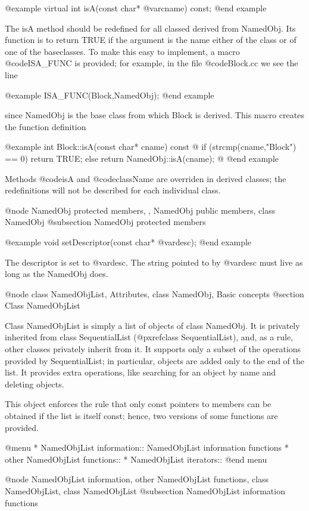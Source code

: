 @example
virtual int isA(const char* @var{cname}) const;
@end example

The isA method should be redefined for all classed derived from
NamedObj.  Its function is to return TRUE if the argument is the name
either of the class or of one of the baseclasses.  To make this easy to
implement, a macro @code{ISA_FUNC} is provided; for example, in the
file @code{Block.cc} we see the line

@example
ISA_FUNC(Block,NamedObj);
@end example

since NamedObj is the base class from which Block is derived.  This
macro creates the function definition

@example
int Block::isA(const char* cname) const @{
        if (strcmp(cname,"Block") == 0) return TRUE;
        else return NamedObj::isA(cname);
@}
@end example

Methods @code{isA} and @code{className} are overriden in derived
classes; the redefinitions will not be described for each individual
class.

@node NamedObj protected members,  , NamedObj public members, class NamedObj
@subsection NamedObj protected members

@example
void setDescriptor(const char* @var{desc});
@end example

The descriptor is set to @var{desc}.  The string pointed to by
@var{desc} must live as long as the NamedObj does.

@node class NamedObjList, Attributes, class NamedObj, Basic concepts
@section Class NamedObjList

Class NamedObjList is simply a list of objects of class NamedObj.
It is privately inherited from class SequentialList
(@pxref{class SequentialList}), and, as a rule,
other classes privately inherit from it.  It supports only a subset
of the operations provided by SequentialList; in particular, objects
are added only to the end of the list.  It provides extra operations,
like searching for an object by name and deleting objects.

This object enforces the rule that only const pointers to members can
be obtained if the list is itself const; hence, two versions of some
functions are provided.

@menu
* NamedObjList information::    NamedObjList information functions
* other NamedObjList functions::
* NamedObjList iterators::
@end menu

@node NamedObjList information, other NamedObjList functions, class NamedObjList, class NamedObjList
@subsection NamedObjList information functions

